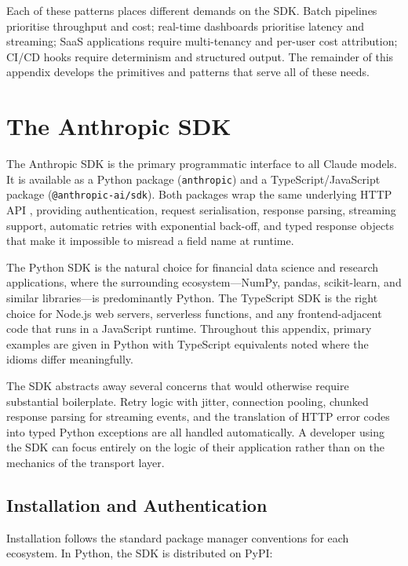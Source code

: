 Each of these patterns places different demands on the SDK. Batch pipelines prioritise
throughput and cost; real-time dashboards prioritise latency and streaming; SaaS
applications require multi-tenancy and per-user cost attribution; CI/CD hooks require
determinism and structured output. The remainder of this appendix develops the
primitives and patterns that serve all of these needs.

\section{The Anthropic SDK}
\label{app:sdk-commercial:sdk}

The Anthropic SDK is the primary programmatic interface to all Claude models. It is
available as a Python package (\texttt{anthropic}) and a TypeScript/JavaScript package
(\texttt{@anthropic-ai/sdk}). Both packages wrap the same underlying HTTP API
\citep{anthropic2025api}, providing authentication, request serialisation, response
parsing, streaming support, automatic retries with exponential back-off, and typed
response objects that make it impossible to misread a field name at runtime.

The Python SDK is the natural choice for financial data science and research
applications, where the surrounding ecosystem---NumPy, pandas, scikit-learn, and
similar libraries---is predominantly Python. The TypeScript SDK is the right choice for
Node.js web servers, serverless functions, and any frontend-adjacent code that runs in
a JavaScript runtime. Throughout this appendix, primary examples are given in Python
with TypeScript equivalents noted where the idioms differ meaningfully.

The SDK abstracts away several concerns that would otherwise require substantial
boilerplate. Retry logic with jitter, connection pooling, chunked response parsing for
streaming events, and the translation of HTTP error codes into typed Python exceptions
are all handled automatically. A developer using the SDK can focus entirely on the
logic of their application rather than on the mechanics of the transport layer.

\subsection{Installation and Authentication}
\label{app:sdk-commercial:sdk:install}

Installation follows the standard package manager conventions for each ecosystem. In
Python, the SDK is distributed on PyPI:

